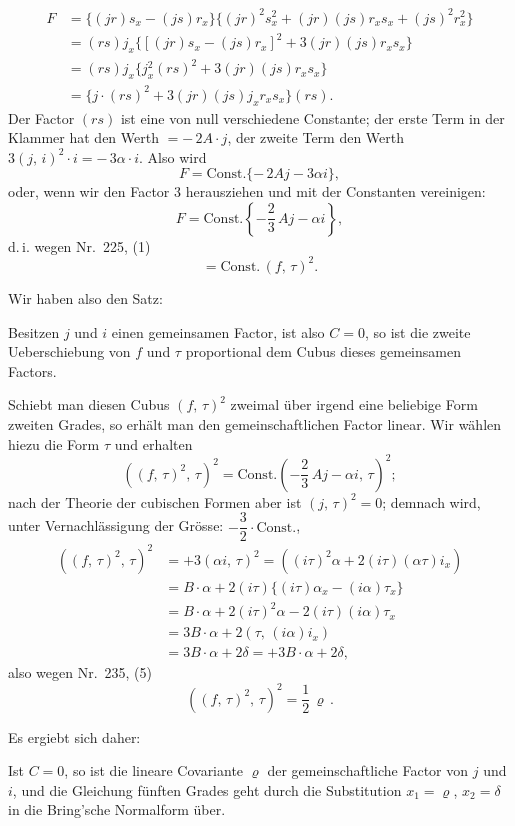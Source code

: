 \[
\begin{aligned}
F &= \{(jr)s_x-(js)r_x\}\{(jr)^2s_x^2+(jr)(js)r_xs_x+(js)^2r_x^2\} \\
&= (rs)j_x\{[(jr)s_x-(js)r_x]^2+3(jr)(js)r_xs_x\} \\
&= (rs)j_x\{j_x^2(rs)^2+3(jr)(js)r_xs_x\} \\
&= \{j\cdot(rs)^2+3(jr)(js)j_xr_xs_x\}(rs).
\end{aligned}
\]
Der Factor $(rs)$ ist eine von null verschiedene Constante; der
erste Term in der Klammer hat den Werth $=-\,2A\cdot j$, der zweite
Term den Werth $3(j,\,i)^2\cdot i=-\,3\alpha\cdot i$. Also wird
\[
F = \text{Const.}\{-\,2Aj-3\alpha i\},
\]
oder, wenn wir den Factor 3 herausziehen und mit der Constanten
vereinigen:
\[
F = \text{Const.}\left\{-\frac{2}{3}\,Aj-\alpha i\right\},
\]
d.\,i. wegen Nr.\ 225, (1)
\[
= \text{Const.}\,(f,\,\tau)^2.
\]

Wir haben also den Satz:

\glqq Besitzen $j$ und $i$ einen gemeinsamen Factor, ist also $C=0$,
so ist die zweite Ueberschiebung von $f$ und $\tau$ proportional
dem Cubus dieses gemeinsamen Factors.\grqq{}

Schiebt man diesen Cubus $(f,\,\tau)^2$ zweimal \"uber irgend eine beliebige
 Form zweiten Grades, so erh\"alt man den gemeinschaftlichen
Factor linear. Wir w\"ahlen hiezu die Form $\tau$ und erhalten
\[
((f,\,\tau)^2,\,\tau)^2 = \text{Const.}\left(-\frac{2}{3}\,Aj-\alpha i,\,\tau\right)^2;
\]
nach der Theorie der cubischen Formen aber ist $(j,\,\tau)^2=0$; demnach
wird, unter Vernachl\"assigung der Gr\"osse: $-\dfrac{3}{2}\cdot\text{Const.}$,
\[
\begin{aligned}
((f,\,\tau)^2,\,\tau)^2 &= +3(\alpha i,\,\tau)^2 = ((i\tau)^2\alpha+2(i\tau)(\alpha\tau)i_x) \\
&= B\cdot\alpha+2(i\tau)\{(i\tau)\alpha_x-(i\alpha)\tau_x\} \\
&= B\cdot\alpha+2(i\tau)^2\alpha-2(i\tau)(i\alpha)\tau_x \\
&= 3B\cdot\alpha+2(\tau,\,(i\alpha)i_x) \\
&= 3B\cdot\alpha+2\delta = +3B\cdot\alpha+2\delta,
\end{aligned}
\]
also wegen Nr.\ 235, (5)
\[
((f,\,\tau)^2,\,\tau)^2 = \frac{1}{2}\,\varrho\,.
\]

Es ergiebt sich daher:

\glqq Ist $C=0$, so ist die lineare Covariante $\varrho$ der gemeinschaftliche
 Factor von $j$ und $i$, und die Gleichung f\"unften Grades
geht durch die Substitution $x_1=\varrho$, $x_2=\delta$ in die Bring'sche
Normalform \"uber.\grqq{}


